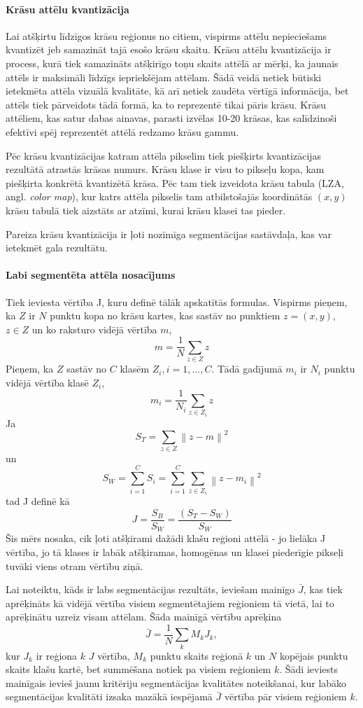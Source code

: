 \documentclass[12pt,paper=a4]{report}
\begin{document}
\paragraph{Krāsu attēlu kvantizācija}Lai atšķirtu līdzīgos krāsu reģionus no citiem, vispirms attēlu nepieciešams kvantizēt jeb samazināt tajā esošo krāsu skaitu. Krāsu attēlu kvantizācija ir process, kurā tiek samazināts atšķirīgo toņu skaits attēlā ar mērķi, ka jaunais attēls ir maksimāli līdzīgs iepriekšējam attēlam. Šādā veidā netiek būtiski ietekmēta attēla vizuālā kvalitāte, kā arī netiek zaudēta vērtīgā informācija, bet attēls tiek pārveidots tādā formā, ka to reprezentē tikai pāris krāsu. Krāsu attēliem, kas satur dabas ainavas, parasti izvēlas 10-20 krāsas, kas salīdzinoši efektīvi spēj reprezentēt attēlā redzamo krāsu gammu.\cite{1colImSegm1999}\par
Pēc krāsu kvantizācijas katram attēla pikselim tiek piešķirts kvantizācijas rezultātā atrastās krāsas numurs. Krāsu klase ir visu to pikseļu kopa, kam piešķirta konkrētā kvantizētā krāsa. Pēc tam tiek izveidota krāsu tabula (LZA, angl. \textit{color map}), kur katrs attēla pikselis tam atbilstošajās koordinātās $(x,y)$ krāsu tabulā tiek aizstāts ar atzīmi, kurai krāsu klasei tas pieder.\cite{1colImSegm1999}\par
Pareiza krāsu kvantizācija ir ļoti nozīmīga segmentācijas sastāvdaļa, kas var ietekmēt gala rezultātu.
\paragraph{Labi segmentēta attēla nosacījums}Tiek ieviesta vērtība J, kuru definē tālāk apskatītās formulas. Vispirms pieņem, ka $Z$ ir $N$ punktu kopa no krāsu kartes, kas sastāv no punktiem $z=(x,y)$, \(z \in Z\) un ko raksturo vidējā vērtība $m$, \[ m=\frac{1}{N}\sum_{z \in Z}z \] Pieņem, ka $Z$ sastāv no $C$ klasēm $Z_i, i=1,...,C$. Tādā gadījumā $m_i$ ir $N_i$ punktu vidējā vērtība klasē $Z_i$, \[ m_i=\frac{1}{N_i}\sum_{z \in Z_i}z \] Ja \[ S_T=\sum_{z \in Z}\left \| z-m \right \|^2 \] un \[ S_W=\sum_{i=1}^{C}S_i=\sum_{i=1}^{C} \sum_{z \in Z_i} \left \| z-m_i \right \|^2 \] tad J definē kā \[ J=\frac{S_B}{S_W}=\frac{(S_T-S_W)}{S_W} \] Šis mērs nosaka, cik ļoti atšķirami dažādi klašu reģioni attēlā - jo lielāka J vērtība, jo tā klases ir labāk atšķiramas, homogēnas un klasei piederīgie pikseļi tuvāki viens otram vērtību ziņā.\cite{1colImSegm1999}\par
Lai noteiktu, kāds ir labs segmentācijas rezultāts, ieviešam mainīgo $\bar{J}$, kas tiek aprēķināts kā vidējā vērtība visiem segmentētajiem reģioniem tā vietā, lai to aprēķinātu uzreiz visam attēlam. Šāda mainīgā vērtību aprēķina \[ \bar{J}=\frac{1}{N}\sum_k M_k J_k, \] kur $J_k$ ir reģiona $k$ $J$ vērtība, $M_k$ punktu skaits reģionā $k$ un $N$ kopējais punktu skaits klašu kartē, bet summēšana notiek pa visiem reģioniem $k$. Šādi ieviests mainīgais ievieš jaunu kritēriju segmentācijas kvalitātes noteikšanai, kur labāko segmentācijas kvalitāti izsaka mazākā iespējamā $\bar{J}$ vērtība pār visiem reģioniem $k$. \cite{1colImSegm1999}\par
\end{document}
